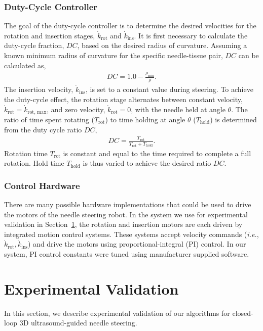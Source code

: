 \subsubsection{Duty-Cycle Controller}
The goal of the duty-cycle controller is to determine the desired velocities for the rotation and insertion stages, $\dot{k}_\text{rot}$ and $\dot{k}_\text{ins}$. It is first necessary to calculate the duty-cycle fraction, $DC$, based on the desired radius of curvature. Assuming a known minimum radius of curvature for the specific needle-tissue pair, $DC$ can be calculated as,
\begin{align}
DC = 1.0 - \frac{\rho_\text{min}}{\rho}. 
\label{eq:DC}
\end{align}
The insertion velocity, $\dot{k}_\text{ins}$, is set to a constant value during steering.  To achieve the duty-cycle effect, the rotation stage alternates between constant velocity, $\dot{k}_\text{rot} = \dot{k}_\text{rot, max}$, and zero velocity, $\dot{k}_\text{rot} = 0$, with the needle held at angle $\theta$. The ratio of time spent rotating ($T_\text{rot}$) to time holding at angle $\theta$ ($T_\text{hold}$) is determined from the duty cycle ratio $DC$,
\begin{align}
DC =\frac{T_\text{rot}}{T_\text{rot}+T_\text{hold}}.
\end{align}
Rotation time $T_\text{rot}$ is constant and equal to the time required to complete a full rotation. Hold time $T_\text{hold}$ is thus varied to achieve the desired ratio $DC$.

\subsubsection{Control Hardware}
There are many possible hardware implementations that could be used to drive the motors of the needle steering robot. In the system we use for experimental validation in Section~\ref{sec:ExperimentalValidation}, the rotation and insertion motors are each driven by integrated motion control systems. These systems accept velocity commands (\textit{i.e.}, $\dot{k}_\text{rot}, \dot{k}_\text{ins}$) and drive the motors using proportional-integral (PI) control. In our system, PI control constants were tuned using manufacturer supplied software.

\section{Experimental Validation}
\label{sec:ExperimentalValidation}
In this section, we describe experimental validation of our algorithms for closed-loop 3D ultrasound-guided needle steering.
